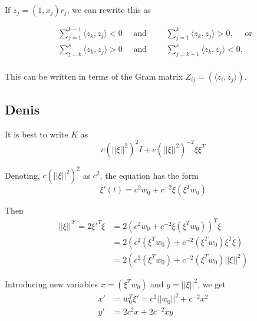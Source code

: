 If $z_j = (1,x_j) r_j$, we can rewrite this as

\begin{equation}
\begin{aligned}\label{eq:attractor_cond}
    &\sum_{j=1}^{k-1} \langle z_k , z_j \rangle < 0 \quad \mbox{ and } \qquad \sum_{j=1}^{k} \langle z_k, z_j \rangle > 0, \quad \mbox{ or }\\
    &\sum_{j=k}^{s} \langle z_k , z_j \rangle > 0 \quad \mbox{ and } \qquad \sum_{j=k+1}^{s} \langle z_k, z_j \rangle < 0.\\
\end{aligned}
\end{equation}


This can be written in terms of the Gram matrix $Z_{ij} = (\langle z_i, z_j\rangle)$.




\subsection{Denis}
It is best to write $K$ as 
\begin{equation}
c(||\xi||^2)^2 I +  c(||\xi||^2)^{-2}  \xi \xi^T
\end{equation} 

Denoting, $c(||\xi||^2)^2$ as $c^2$, the equation has the form  
\begin{equation}
    \xi'(t) =  c^2 w_0 + c^{-2} \xi (\xi^T w_0)
\end{equation}

Then
\begin{equation}
\begin{aligned}
||\xi||^{2\prime} = 2 \xi'^T \xi &= 2(c^2 w_0 + c^{-2} \xi (\xi^T w_0))^T \xi\\
                          &= 2(c^2 (\xi^T w_0) + c^{-2} (\xi^T w_0) \xi^T \xi)\\
                          &= 2(c^2 (\xi^T w_0) + c^{-2} (\xi^T w_0) ||\xi||^2)
\end{aligned}
\end{equation}

Introducing new variables $x = (\xi^T w_0)$ and $y = ||\xi||^2$, we get
\begin{equation}
\begin{aligned}
x' &= w_0^T \xi' = c^2 ||w_0||^2 + c^{-2} x^2\\
y' &= 2 c^2x + 2 c^{-2} x y 
\end{aligned}
\end{equation}


